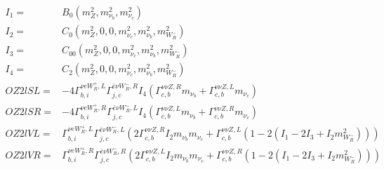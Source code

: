 \documentclass[A4,landscape]{article}
\begin{document}
\begin{align} 
I_1= & B_0(m^2_{Z}, m^2_{\nu_{{b}}}, m^2_{\nu_{{c}}}) \\ 
I_2= & C_0(m^2_{Z}, 0, 0, m^2_{\nu_{{c}}}, m^2_{\nu_{{b}}}, m^2_{W_R^-}) \\ 
I_3= & C_{00}(m^2_{Z}, 0, 0, m^2_{\nu_{{c}}}, m^2_{\nu_{{b}}}, m^2_{W_R^-}) \\ 
I_4= & C_2(m^2_{Z}, 0, 0, m^2_{\nu_{{c}}}, m^2_{\nu_{{b}}}, m^2_{W_R^-}) \\ 
  OZ2lSL= & -4  \Gamma^{\nu e W_R^+,L}_{b, i} \Gamma^{\bar{e}\nu W_R^- ,R}_{j, c} I_4 (\Gamma^{\nu \nu Z ,R}_{c, b} m_{\nu_{{b}}} + \Gamma^{\nu \nu Z ,L}_{c, b} m_{\nu_{{c}}}) \\ 
  OZ2lSR= & -4  \Gamma^{\nu e W_R^+,R}_{b, i} \Gamma^{\bar{e}\nu W_R^- ,L}_{j, c} I_4 (\Gamma^{\nu \nu Z ,L}_{c, b} m_{\nu_{{b}}} + \Gamma^{\nu \nu Z ,R}_{c, b} m_{\nu_{{c}}}) \\ 
  OZ2lVL= &  \Gamma^{\nu e W_R^+,L}_{b, i} \Gamma^{\bar{e}\nu W_R^- ,L}_{j, c} (2 \Gamma^{\nu \nu Z ,R}_{c, b} I_2 m_{\nu_{{b}}} m_{\nu_{{c}}} + \Gamma^{\nu \nu Z ,L}_{c, b} (1 - 2 (I_1 - 2 I_3 + I_2 m^2_{W_R^-}))) \\ 
  OZ2lVR= &  \Gamma^{\nu e W_R^+,R}_{b, i} \Gamma^{\bar{e}\nu W_R^- ,R}_{j, c} (2 \Gamma^{\nu \nu Z ,L}_{c, b} I_2 m_{\nu_{{b}}} m_{\nu_{{c}}} + \Gamma^{\nu \nu Z ,R}_{c, b} (1 - 2 (I_1 - 2 I_3 + I_2 m^2_{W_R^-}))) \\ 
\end{align} 
\end{document}
